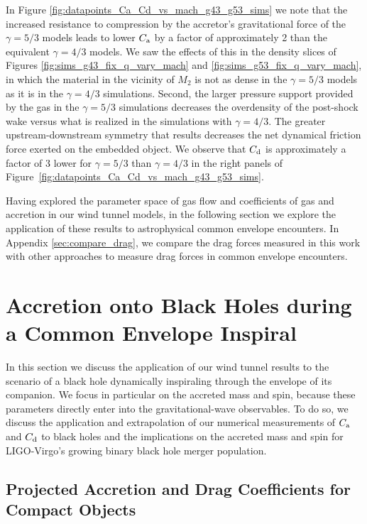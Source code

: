 In Figure \ref{fig:datapoints_Ca_Cd_vs_mach_g43_g53_sims} we note that the increased resistance to compression by the accretor's gravitational force of the $\gamma = 5/3$ models leads to lower $C_{\rm a}$ by a factor of approximately 2 than the equivalent $\gamma=4/3$ models.   We saw the effects of this in the density slices of Figures \ref{fig:sims_g43_fix_q_vary_mach} and \ref{fig:sims_g53_fix_q_vary_mach}, in which the material in the vicinity of $M_2$ is not as dense in the $\gamma = 5/3$ models as it is in the $\gamma = 4/3$ simulations.  Second, the larger pressure support provided by the gas in the $\gamma = 5/3$ simulations decreases the overdensity of the post-shock wake versus what is realized in the simulations with $\gamma = 4/3$.  The greater upstream-downstream symmetry that results decreases the net dynamical friction force exerted on the embedded object. We observe that $C_{\rm d}$ is approximately a factor of 3 lower for $\gamma=5/3$ than $\gamma=4/3$ in the right panels of Figure~\ref{fig:datapoints_Ca_Cd_vs_mach_g43_g53_sims}. 

Having explored the parameter space of gas flow and coefficients of gas and accretion in our wind tunnel models, in the following section we explore the application of these results to astrophysical common envelope encounters. In Appendix \ref{sec:compare_drag}, we compare the drag forces measured in this work with other approaches to measure drag forces in common envelope encounters.

\vspace{5mm}
\section{Accretion onto Black Holes during a Common Envelope Inspiral}\label{sec:implications}
In this section we discuss the application of our wind tunnel results to the scenario of a black hole dynamically inspiraling through the envelope of its companion. We focus in particular on the accreted mass and spin, because these parameters directly enter into the gravitational-wave observables.  To do so, we discuss the application and extrapolation of our numerical measurements of $C_{\rm a}$ and $C_{\rm d}$ to black holes and the implications on the accreted mass and spin for LIGO-Virgo's growing binary black hole merger population. 

\vspace*{2.5mm}
\subsection{Projected Accretion and Drag Coefficients for Compact Objects}\label{sec:sink}

